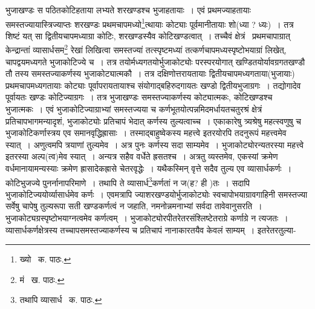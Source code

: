 \documentclass[11pt, openany]{book}
\begin{document}
\noindent भुजाखण्डः स पठितकोटिहताया लभ्यते शरखण्डश्च भुजाहतायाः~। एवं प्रथमज्याहतायाः समस्तज्यायास्त्रिज्याप्तः शरखण्डः
प्रथमचापमध्यो\renewcommand{\thefootnote}{१}\footnote{ख्यो \textendash\ क. पाठः.}त्थायाः कोट्याः पूर्वमानीतायाः शो(ध्या ? ध्यः)~। तत्र शिष्टं यत् सा द्वितीयचापमध्याग्रा कोटिः, शरखण्डस्यैव कोटिखण्डत्वात्~। तच्चैवं क्षेत्रं \textendash\ प्रथमचापाग्रात् केन्द्रान्तां व्यासार्धसम\renewcommand{\thefootnote}{२}\footnote{मं \textendash\ ख. पाठः.} रेखां लिखित्वा समस्तज्यां तत्स्पृष्टमध्यां तत्कर्णचापमध्यस्पृष्टोभयाग्रां लिखेत्, चापद्वयमध्यगते भुजाकोटिज्ये च~। तत्र तयोर्मध्यगतयोर्भुजाकोट्योः परस्परयोगात् खण्डितयोर्यावग्रगतखण्डौ तौ तस्य समस्तज्याकर्णस्य भुजाकोट्यात्मकौ~। तत्र दक्षिणोत्तरायतायाः द्वितीयचापमध्यगताया(भुजायाः) प्रथमचापमध्यगतायाः कोट्याः पूर्वापरायतायाश्च संयोगाद्बहिरुदगायतः खण्डो द्वितीयभुजाग्रगः~। तद्योगादेव पूर्वायतः खण्डः कोटिज्याग्रगः~। तत्र भुजाखण्डः समस्तज्याकर्णस्य कोट्यात्मकः, कोटिखण्डश्च भुजात्मकः~। एवं भुजाकोटिज्याग्राभ्यां समस्तज्यया च कर्णभूतयोत्पन्नमिदमर्धायतचतुरश्रं क्षेत्रं प्रतिचापभागमन्यादृशं, भुजाकोट्योः प्रतिचापं भेदात् कर्णस्य तुल्यत्वाच्च~। एकाकारेषु त्र्यश्रेषु महत्स्वणुषु च भुजाकोटिकर्णास्त्रय एव समानवृद्धिह्रासाः~। तस्माद्बाहुष्वेकस्य महत्त्वे इतरयोरपि तदनुरूपं महत्त्वमेव स्यात्~। अणुत्वमपि त्रयाणां तुल्यमेव~। अत्र पुनः कर्णस्य सदा साम्यमेव~। भुजाकोट्योरन्यतरस्या महत्त्वे इतरस्या अल्प(त्व)मेव स्यात्~। अन्यत्र सहैव वर्धेते ह्रसतश्च~। अत्रतु व्यस्तमेव, एकस्यां क्रमेण
वर्धमानायामन्यस्याः क्रमेण ह्रासादेकह्रासे चेतरवृद्धेः~। यथैकस्मिन् वृत्ते सदैव तुल्य एव व्यासार्धकर्णः~। कोटिभुजज्ये पुनर्नानापरिमाणे~। तथापि ते व्यासार्ध\renewcommand{\thefootnote}{३}\footnote{तथापि व्यासार्ध \textendash\ क. पाठः.}कर्णतां न ज(ह? ही )तः~। सदापि भुजाकोटिज्ययोर्व्यासार्धमेव कर्णः~। एवमत्रापि ज्याशरखण्डयोर्भुजाकोट्योः स्वचापोभयाग्रावगाहिनी समस्तज्या सर्वेषु चापेषु तुल्यरूपा सती खण्डकर्णत्वं न जहाति, नमनोन्नमनाभ्यां सर्वदा तावेवानुसरति~। भुजाकोट्यग्रस्पृष्टोभयाग्नत्वमेव कर्णत्वम्~। भुजाकोट्योरपीतरेतरसंश्लिष्टेतराग्रे कर्णाग्रे न त्यजतः~। व्यासार्धकर्णक्षेत्रस्य तच्चापसमस्तज्याकर्णस्य च प्रतिचापं नानाकारतयैव केवलं साम्यम्~। इतरेतरतुल्या-

\newpage
\end{document}
